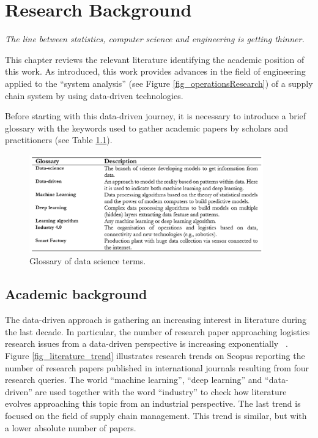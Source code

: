 \chapter{Research Background}

\epigraph{\textit{The line between statistics, computer science and engineering is getting thinner.}}{}


This chapter reviews the relevant literature identifying the academic position of this work. As introduced, this work provides advances in the field of engineering applied to the “system analysis” (see Figure \ref{fig_operationsResearch}) of a supply chain system by using data-driven technologies.\par

Before starting with this data-driven journey, it is necessary to introduce a brief glossary with the keywords used to gather academic papers by scholars and practitioners (see Table \ref{tab_dataGlossary}).

\begin{figure}[hbt!]
\centering
\includegraphics[width=0.9\textwidth]{SectionIntroduction/researchBackground_figures/tab_dataGlossary.png}
\captionsetup{type=figure}
\caption{Glossary of data science terms.}
\label{tab_dataGlossary}
\end{figure}

\section{Academic background}

The data-driven approach is gathering an increasing interest in literature during the last decade. In particular, the number of research paper approaching logistics research issues from a data-driven perspective is increasing exponentially ~\cite{Moktadir2019, Spanaki2018}. Figure \ref{fig_literature_trend} illustrates research trends on Scopus reporting the number of research papers published in international journals resulting from four research queries. The world “machine learning”, “deep learning” and “data-driven” are used together with the word “industry” to check how literature evolves approaching this topic from an industrial perspective. The last trend is focused on the field of supply chain management. This trend is similar, but with a lower absolute number of papers.

